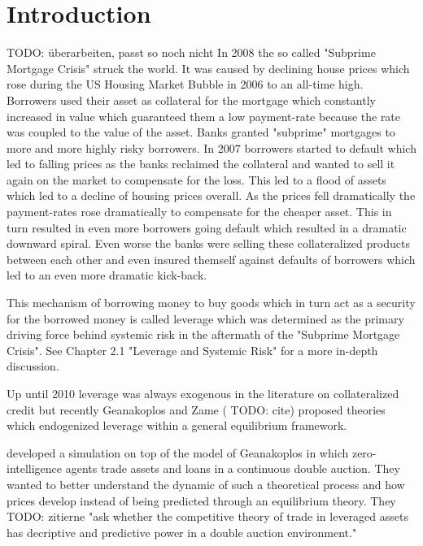 \documentclass[Bachelorarbeit.tex]{subfiles}
\begin{document}
\chapter{Introduction}
TODO: überarbeiten, passt so noch nicht
In 2008 the so called "Subprime Mortgage Crisis" struck the world. It was caused by declining house prices which rose during the US Housing Market Bubble in 2006 to an all-time high. Borrowers used their asset as collateral for the mortgage which constantly increased in value which guaranteed them a low payment-rate because the rate was coupled to the value of the asset.
Banks granted "subprime" mortgages to more and more highly risky borrowers. In 2007 borrowers started to default which led to falling prices as the banks reclaimed the collateral and wanted to sell it again on the market to compensate for the loss. This led to a flood of assets which led to a decline of housing prices overall.
As the prices fell dramatically the payment-rates rose dramatically to compensate for the cheaper asset. This in turn resulted in even more borrowers going default which resulted in a dramatic downward spiral.
Even worse the banks were selling these collateralized products between each other and even insured themself against defaults of borrowers which led to an even more dramatic kick-back.

\thinspace

This mechanism of borrowing money to buy goods which in turn act as a security for the borrowed money is called leverage which was determined as the primary driving force behind systemic risk in the aftermath of the "Subprime Mortgage Crisis". See Chapter 2.1 "Leverage and Systemic Risk" for a more in-depth discussion.

\bigskip

Up until 2010 leverage was always exogenous in the literature on collateralized credit but recently Geanakoplos and Zame ( TODO: cite) proposed theories which endogenized leverage within a general equilibrium framework.

\thinspace

\cite{Breuer2015} developed a simulation on top of the model of Geanakoplos in which zero-intelligence agents trade assets and loans in a continuous double auction. They wanted to better understand the dynamic of such a theoretical process and how prices develop instead of being predicted through an equilibrium theory. They TODO: zitierne "ask whether the competitive theory of trade in leveraged assets has decriptive and predictive power in a double auction environment."
\end{document}
